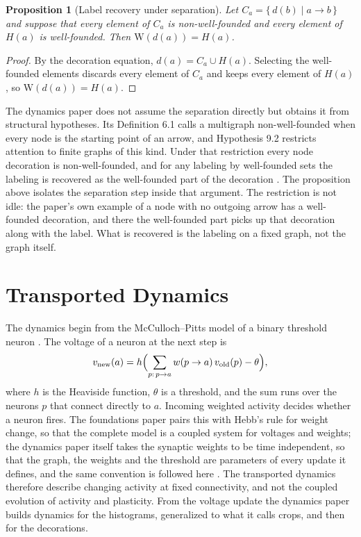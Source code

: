 \documentclass[11pt, a4paper]{article}
\theoremstyle{plain}
\newtheorem{proposition}[theorem]{Proposition}
\theoremstyle{definition}
\theoremstyle{remark}
\newcommand{\lift}{\mathrm{W}}
\begin{document}
\begin{proposition}[Label recovery under separation]
Let $C_a = \{\, d(b) \mid a \to b \,\}$ and suppose that every element of $C_a$ is non-well-founded and every element of $H(a)$ is well-founded. Then $\lift(d(a)) = H(a)$.
\end{proposition}

\begin{proof}
By the decoration equation, $d(a) = C_a \cup H(a)$. Selecting the well-founded elements discards every element of $C_a$ and keeps every element of $H(a)$, so $\lift(d(a)) = H(a)$.
\end{proof}

The dynamics paper does not assume the separation directly but obtains it from structural hypotheses. Its Definition 6.1 calls a multigraph non-well-founded when every node is the starting point of an arrow, and Hypothesis 9.2 restricts attention to finite graphs of this kind. Under that restriction every node decoration is non-well-founded, and for any labeling by well-founded sets the labeling is recovered as the well-founded part of the decoration \cite[Propositions 6.2, 6.3 and 9.3]{mz2010}. The proposition above isolates the separation step inside that argument. The restriction is not idle: the paper's own example of a node with no outgoing arrow has a well-founded decoration, and there the well-founded part picks up that decoration along with the label. What is recovered is the labeling on a fixed graph, not the graph itself.

\section{Transported Dynamics}

The dynamics begin from the McCulloch--Pitts model of a binary threshold neuron \cite{mz2009,mz2010}. The voltage of a neuron at the next step is
\[
v_{\mathrm{new}}(a) = h\Bigl( \sum_{p :\, p \to a} w(p \to a)\, v_{\mathrm{old}}(p) - \theta \Bigr),
\]
where $h$ is the Heaviside function, $\theta$ is a threshold, and the sum runs over the neurons $p$ that connect directly to $a$. Incoming weighted activity decides whether a neuron fires. The foundations paper pairs this with Hebb's rule for weight change, so that the complete model is a coupled system for voltages and weights; the dynamics paper itself takes the synaptic weights to be time independent, so that the graph, the weights and the threshold are parameters of every update it defines, and the same convention is followed here \cite[Section 7 and Remark 7.5]{mz2010}. The transported dynamics therefore describe changing activity at fixed connectivity, and not the coupled evolution of activity and plasticity. From the voltage update the dynamics paper builds dynamics for the histograms, generalized to what it calls crops, and then for the decorations.
\end{document}
